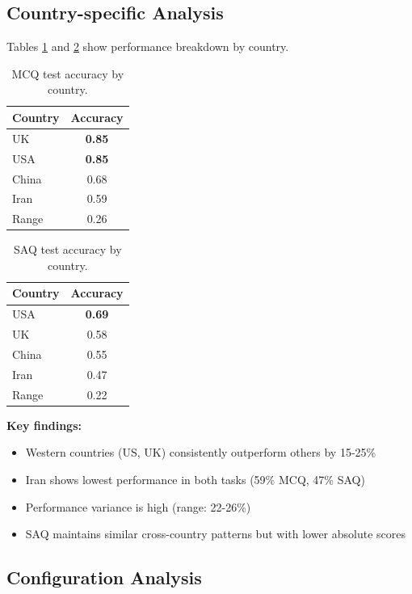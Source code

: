 \documentclass[11pt,a4paper,twocolumn]{article}
\begin{document}
\subsection{Country-specific Analysis}

Tables \ref{tab:mcq_country} and \ref{tab:saq_country} show performance breakdown by country.

\begin{table}[h]
\centering
\begin{tabular}{lc}
\toprule
\textbf{Country} & \textbf{Accuracy} \\
\midrule
UK & \textbf{0.85} \\
USA & \textbf{0.85} \\
China & 0.68 \\
Iran & 0.59 \\
\midrule
Range & 0.26 \\
\bottomrule
\end{tabular}
\caption{MCQ test accuracy by country.}
\label{tab:mcq_country}
\end{table}

\begin{table}[h]
\centering
\begin{tabular}{lc}
\toprule
\textbf{Country} & \textbf{Accuracy} \\
\midrule
USA & \textbf{0.69} \\
UK & 0.58 \\
China & 0.55 \\
Iran & 0.47 \\
\midrule
Range & 0.22 \\
\bottomrule
\end{tabular}
\caption{SAQ test accuracy by country.}
\label{tab:saq_country}
\end{table}

\textbf{Key findings:}
\begin{itemize}
\item Western countries (US, UK) consistently outperform others by 15-25\%
\item Iran shows lowest performance in both tasks (59\% MCQ, 47\% SAQ)
\item Performance variance is high (range: 22-26\%)
\item SAQ maintains similar cross-country patterns but with lower absolute scores
\end{itemize}

\subsection{Configuration Analysis}
\end{document}
